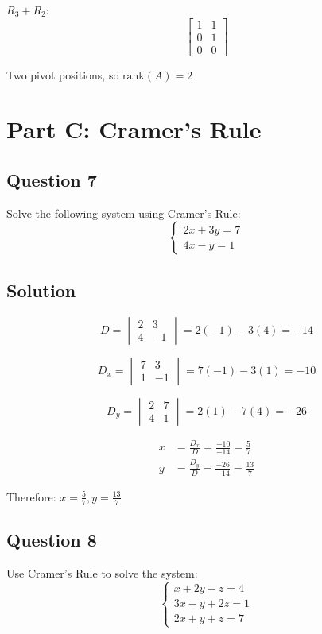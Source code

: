 \documentclass[12pt]{article}
\begin{document}
$R_3 + R_2$:
\[
	\begin{bmatrix}
		1 & 1 \\
		0 & 1 \\
		0 & 0
	\end{bmatrix}
\]

Two pivot positions, so $\text{rank}(A) = 2$

\vspace{2em}
\section*{Part C: Cramer's Rule}
\hrulefill
\vspace{1em}

\subsection*{Question 7}
Solve the following system using Cramer's Rule:
$$
\begin{cases}
2x + 3y = 7 \\
4x - y = 1
\end{cases}
$$

\subsection*{Solution}

\[
	D = \begin{vmatrix}
		2 & 3 \\
		4 & -1
	\end{vmatrix} = 2(-1) - 3(4) = -14
\]

\[
	D_x = \begin{vmatrix}
		7 & 3 \\
		1 & -1
	\end{vmatrix} = 7(-1) - 3(1) = -10
\]

\[
	D_y = \begin{vmatrix}
		2 & 7 \\
		4 & 1
	\end{vmatrix} = 2(1) - 7(4) = -26
\]

\begin{align*}
	x &= \frac{D_x}{D} = \frac{-10}{-14} = \frac{5}{7} \\
	y &= \frac{D_y}{D} = \frac{-26}{-14} = \frac{13}{7}
\end{align*}

Therefore: $x = \frac{5}{7}, y = \frac{13}{7}$

\subsection*{Question 8}
Use Cramer's Rule to solve the system:
$$
\begin{cases}
x + 2y - z = 4 \\
3x - y + 2z = 1 \\
2x + y + z = 7
\end{cases}
$$
\end{document}
